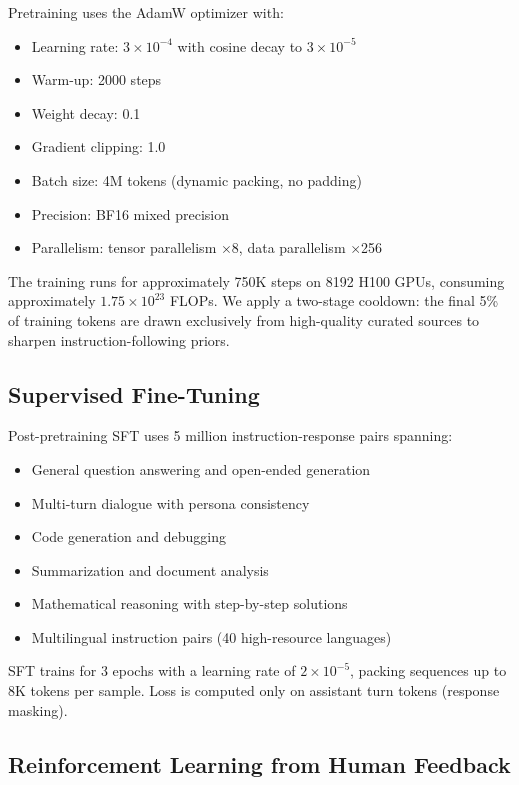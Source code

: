 \documentclass[11pt,a4paper]{article}
\begin{document}
Pretraining uses the AdamW optimizer \cite{loshchilov2019decoupled} with:

\begin{itemize}
  \item Learning rate: $3 \times 10^{-4}$ with cosine decay to $3 \times 10^{-5}$
  \item Warm-up: 2000 steps
  \item Weight decay: 0.1
  \item Gradient clipping: 1.0
  \item Batch size: 4M tokens (dynamic packing, no padding)
  \item Precision: BF16 mixed precision
  \item Parallelism: tensor parallelism $\times$8, data parallelism $\times$256
\end{itemize}

The training runs for approximately 750K steps on 8192 H100 GPUs, consuming approximately
$1.75 \times 10^{23}$ FLOPs. We apply a two-stage cooldown: the final 5\% of training tokens
are drawn exclusively from high-quality curated sources to sharpen instruction-following priors.

\subsection{Supervised Fine-Tuning}

Post-pretraining SFT uses 5 million instruction-response pairs spanning:

\begin{itemize}
  \item General question answering and open-ended generation
  \item Multi-turn dialogue with persona consistency
  \item Code generation and debugging
  \item Summarization and document analysis
  \item Mathematical reasoning with step-by-step solutions
  \item Multilingual instruction pairs (40 high-resource languages)
\end{itemize}

SFT trains for 3 epochs with a learning rate of $2 \times 10^{-5}$, packing sequences up to 8K
tokens per sample. Loss is computed only on assistant turn tokens (response masking).

\subsection{Reinforcement Learning from Human Feedback}
\end{document}
